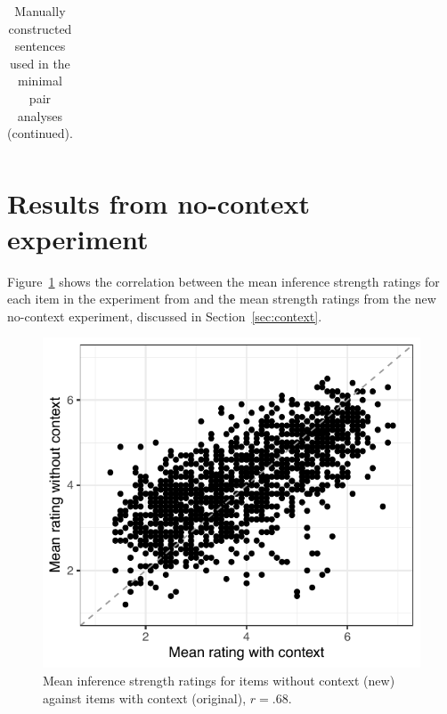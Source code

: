 \documentclass[11pt,a4paper]{article}
\newcommand{\figref}[1]{Figure~\ref{#1}}
\newcommand{\sectionref}[1]{Section~\ref{#1}}
\begin{document}
\begin{table}[h]
\begin{tabular}{|p{}|p{}|}
        
    \end{tabular}
    \caption{Manually constructed sentences used in the minimal pair analyses (continued).}
    \label{tbl:artificial-sentences-2}
    \vspace{5em}
\end{table}

\clearpage

\section{Results from no-context experiment}
\label{app:no-context} \figref{fig:context-nocontext} shows the correlation between the mean inference strength ratings for each item in the experiment from \citet{degen2015investigating} and the mean strength ratings from the new no-context experiment, discussed in \sectionref{sec:context}.
\begin{figure}[h]
\centering
	\includegraphics[width=.49\textwidth]{./images/scatterplot-context-nocontext}
	\caption{Mean inference strength ratings for items without context (new) against items with context (original), $r=.68$.}
	\label{fig:context-nocontext}
\end{figure}
\end{document}
